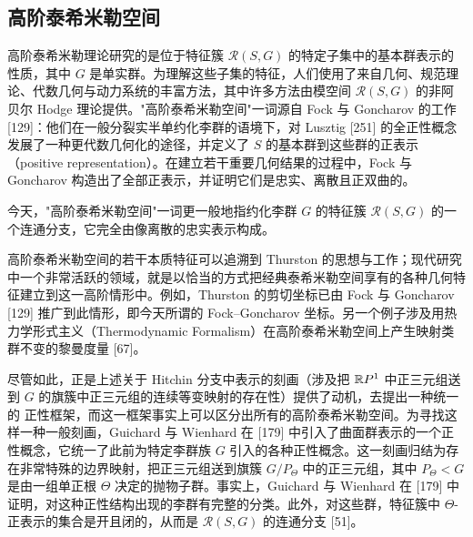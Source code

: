 
\subsection*{高阶泰希米勒空间}

高阶泰希米勒理论研究的是位于特征簇 $\mathcal{R}(S,G)$ 的特定子集中的基本群表示的性质，其中 $G$ 是单实群。为理解这些子集的特征，人们使用了来自几何、规范理论、代数几何与动力系统的丰富方法，其中许多方法由模空间 $\mathcal{R}(S,G)$ 的非阿贝尔 Hodge 理论提供。"高阶泰希米勒空间"一词源自 Fock 与 Goncharov 的工作 [129]：他们在一般分裂实半单约化李群的语境下，对 Lusztig [251] 的全正性概念发展了一种更代数几何化的途径，并定义了 $S$ 的基本群到这些群的正表示（positive representation）。在建立若干重要几何结果的过程中，Fock 与 Goncharov 构造出了全部正表示，并证明它们是忠实、离散且正双曲的。

今天，"高阶泰希米勒空间"一词更一般地指约化李群 $G$ 的特征簇 $\mathcal{R}(S,G)$ 的一个连通分支，它完全由像离散的忠实表示构成。

高阶泰希米勒空间的若干本质特征可以追溯到 Thurston 的思想与工作；现代研究中一个非常活跃的领域，就是以恰当的方式把经典泰希米勒空间享有的各种几何特征建立到这一高阶情形中。例如，Thurston 的剪切坐标已由 Fock 与 Goncharov [129] 推广到此情形，即今天所谓的 Fock--Goncharov 坐标。另一个例子涉及用热力学形式主义（Thermodynamic Formalism）在高阶泰希米勒空间上产生映射类群不变的黎曼度量 [67]。

尽管如此，正是上述关于 Hitchin 分支中表示的刻画（涉及把 $\mathbb{R} P^1$ 中正三元组送到 $G$ 的旗簇中正三元组的连续等变映射的存在性）提供了动机，去提出一种统一的
正性框架，而这一框架事实上可以区分出所有的高阶泰希米勒空间。为寻找这样一种一般刻画，Guichard 与 Wienhard 在 [179] 中引入了曲面群表示的一个正性概念，它统一了此前为特定李群族 $G$ 引入的各种正性概念。这一刻画归结为存在非常特殊的边界映射，把正三元组送到旗簇 $G/P_\Theta$ 中的正三元组，其中 $P_\Theta<G$ 是由一组单正根 $\Theta$ 决定的抛物子群。事实上，Guichard 与 Wienhard 在 [179] 中证明，对这种正性结构出现的李群有完整的分类。此外，对这些群，特征簇中 $\Theta$-正表示的集合是开且闭的，从而是 $\mathcal{R}(S,G)$ 的连通分支 [51]。

